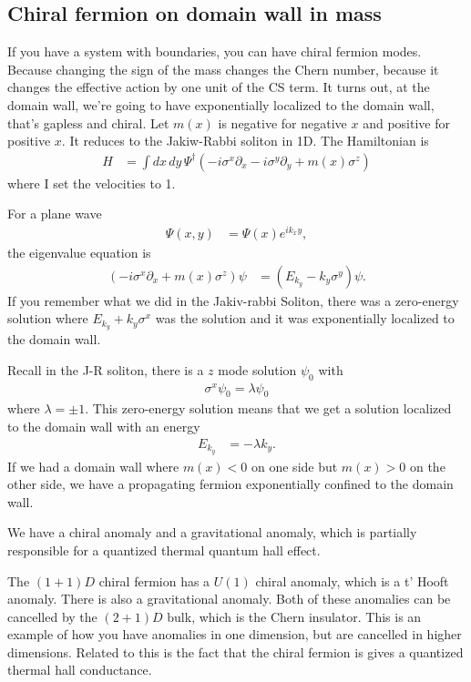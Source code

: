 \subsection{Chiral fermion on domain wall in mass}
If you have a system with boundaries,
you can have chiral fermion modes.
Because changing the sign of the mass changes the Chern number,
because it changes the effective action by one unit of the CS term.
It turns out,
at the domain wall,
we're going to have exponentially localized to the domain wall,
that's gapless and chiral.
Let $m(x)$ is negative for negative $x$ and positive for positive $x$.
It reduces to the Jakiw-Rabbi soliton in 1D.
The Hamiltonian is
\begin{align}
    H &=
    \int dx\, dy\,
    \Psi^\dagger\left(
        -i\sigma^x \partial_x - i\sigma^y \partial_y + m(x) \sigma^z
    \right)
\end{align}
where I set the velocities to 1.

For a plane wave
\begin{align}
    \Psi(x, y) &= \Psi(x) e^{ik_x y},
\end{align}
the eigenvalue equation is
\begin{align}
    \left( -i\sigma^x \partial_x + m(x) \sigma^z \right)\psi
    &=
    \left( E_{k_y} - k_y \sigma^y \right)\psi.
\end{align}
If you remember what we did in the Jakiv-rabbi Soliton,
there was a zero-energy solution where
$E_{k_y} + k_y \sigma^x$ was the solution
and it was exponentially localized to the domain wall.

Recall in the J-R soliton,
there is a $z$ mode solution $\psi_0$
with
\begin{align}
    \sigma^x \psi_0 = \lambda \psi_0
\end{align}
where $\lambda = \pm 1$.
This zero-energy solution means that we get a solution localized to the domain
wall with an energy
\begin{align}
    E_{k_y} &= -\lambda k_y.
\end{align}
If we had a domain wall where $m(x)<0$ on one side
but $m(x)>0$ on the other side, 
we have a propagating fermion exponentially confined to the domain wall.

We have a chiral anomaly and a gravitational anomaly,
which is partially responsible for a quantized thermal quantum hall effect.

The $(1+1)D$ chiral fermion has a
$U(1)$ chiral anomaly,
which is a t' Hooft anomaly.
There is also a gravitational anomaly.
Both of these anomalies can be cancelled by the
$(2+1)D$ bulk,
which is the Chern insulator.
This is an example
of how you have anomalies in one dimension,
but are cancelled in higher dimensions.
Related to this is the fact that the chiral fermion is gives a quantized thermal
hall conductance.

